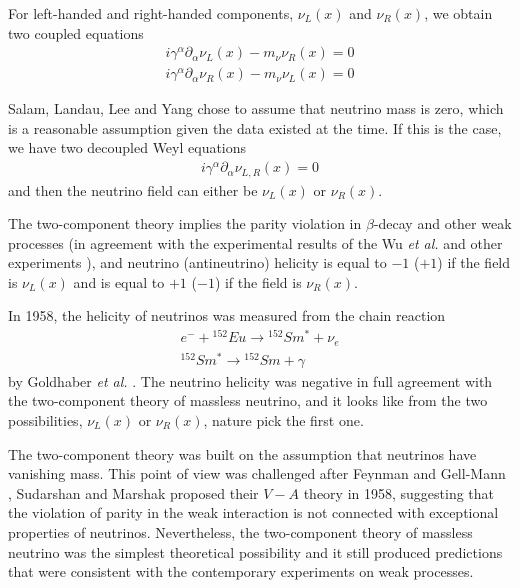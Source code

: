 \documentclass[english]{article}
\begin{document}
    For left-handed and right-handed components, $\nu_{L} (x)$ and  $\nu_{R} (x)$, we obtain two coupled equations
    \begin{gather}
    	i\gamma^{\alpha} \partial_{\alpha} \nu_{L} (x) - m_{\nu} \nu_{R} (x) = 0 \\
        i\gamma^{\alpha} \partial_{\alpha} \nu_{R} (x) - m_{\nu} \nu_{L} (x) = 0
    \end{gather}
    
    Salam, Landau, Lee and Yang chose to assume that neutrino mass is zero, which is a reasonable assumption given the data existed at the time. If this is the case, we have two decoupled Weyl equations
    \begin{gather}
    	i\gamma^{\alpha} \partial_{\alpha} \nu_{L,R} (x) = 0
    \end{gather}
    and then the neutrino field can either be $\nu_{L} (x)$ or $\nu_{R} (x)$.
    
    The two-component theory implies the parity violation in $\beta$-decay and other weak processes (in agreement with the experimental results of the Wu \textit{et al.} and other experiments \cite{wu1957} \cite{garwinledermanweinrich1957}), and neutrino (antineutrino) helicity is equal to $-1$ ($+1$) if the field is $\nu_{L} (x)$ and is equal to $+1$ ($-1$) if the field is $\nu_{R} (x)$.
    
    In 1958, the helicity of neutrinos was measured from the chain reaction
    \begin{gather}
    	e^{-} + {}^{152} Eu \rightarrow {}^{152} Sm^{*} + \nu_{e} \\
        {}^{152} Sm^{*} \rightarrow {}^{152} Sm + \gamma
    \end{gather}
    by Goldhaber \textit{et al.} \cite{goldhabergrodzinssunyar1958}. The neutrino helicity was negative in full agreement with the two-component theory of massless neutrino, and it looks like from the two possibilities, $\nu_{L} (x)$ or $\nu_{R} (x)$, nature pick the first one.
    
    The two-component theory was built on the assumption that neutrinos have vanishing mass. This point of view was challenged after Feynman and Gell-Mann \cite{feynmangellmann1958}, Sudarshan and Marshak \cite{sudarshanmarshak1958} proposed their $V - A$ theory in 1958, suggesting that the violation of parity in the weak interaction is not connected with exceptional properties of neutrinos. Nevertheless, the two-component theory of massless neutrino was the simplest theoretical possibility and it still produced predictions that were consistent with the contemporary experiments on weak processes.
    
\end{document}
